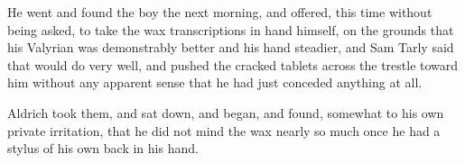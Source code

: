 He went and found the boy the next morning, and offered, this time without being asked, to take the wax transcriptions in hand himself, on the grounds that his Valyrian was demonstrably better and his hand steadier, and Sam Tarly said that would do very well, and pushed the cracked tablets across the trestle toward him without any apparent sense that he had just conceded anything at all.

Aldrich took them, and sat down, and began, and found, somewhat to his own private irritation, that he did not mind the wax nearly so much once he had a stylus of his own back in his hand.
